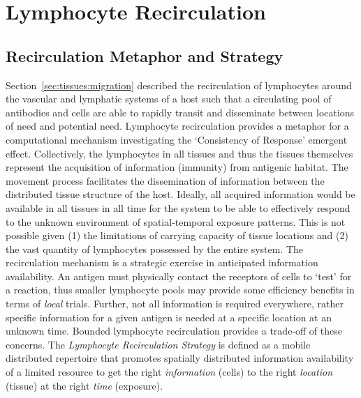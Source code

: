 %
%
\section{Lymphocyte Recirculation}
\label{sec:tissues:recirculation}

%
%
\subsection{Recirculation Metaphor and Strategy}
Section~\ref{sec:tissues:migration} described the recirculation of lymphocytes around the vascular and lymphatic systems of a host such that a circulating pool of antibodies and cells are able to rapidly transit and disseminate between locations of need and potential need. Lymphocyte recirculation provides a metaphor for a computational mechanism investigating the `Consistency of Response' emergent effect. 
Collectively, the lymphocytes in all tissues and thus the tissues themselves represent the acquisition of information (immunity) from antigenic habitat. The movement process facilitates the dissemination of information between the distributed tissue structure of the host. Ideally, all acquired information would be available in all tissues in all time for the system to be able to effectively respond to the unknown environment of spatial-temporal exposure patterns. This is not possible given (1) the limitations of carrying capacity of tissue locations and (2) the vast quantity of lymphocytes possessed by the entire system. The recirculation mechanism is a strategic exercise in anticipated information availability. An antigen must physically contact the receptors of cells to `test' for a reaction, thus smaller lymphocyte pools may provide some efficiency benefits in terms of \emph{local} trials. Further, not all information is required everywhere, rather specific information for a given antigen is needed at a specific location at an unknown time. Bounded lymphocyte recirculation provides a trade-off of these concerns. The \emph{Lymphocyte Recirculation Strategy} is defined as a mobile distributed repertoire that promotes spatially distributed information availability of a limited resource to get the right \emph{information} (cells) to the right \emph{location} (tissue) at the right \emph{time} (exposure).

%
%
